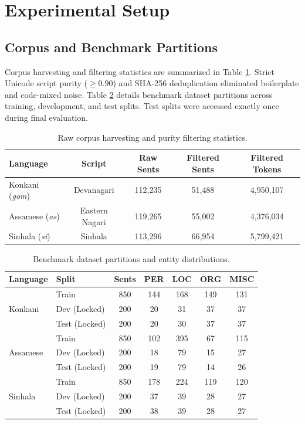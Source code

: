 \documentclass[default,iicol]{sn-jnl}
\begin{document}
\section{Experimental Setup}\label{sec5}

\subsection{Corpus and Benchmark Partitions}
Corpus harvesting and filtering statistics are summarized in Table \ref{tab1}. Strict Unicode script purity ($\ge 0.90$) and SHA-256 deduplication eliminated boilerplate and code-mixed noise. Table \ref{tab2} details benchmark dataset partitions across training, development, and test splits. Test splits were accessed exactly once during final evaluation.

\begin{table}[h]
\caption{Raw corpus harvesting and purity filtering statistics.}\label{tab1}
\centering
\begin{tabular}{lcccc}
\toprule
Language & Script & Raw Sents & Filtered Sents & Filtered Tokens \\
\midrule
Konkani (\textit{gom}) & Devanagari & 112,235 & 51,488 & 4,950,107 \\
Assamese (\textit{as}) & Eastern Nagari & 119,265 & 55,002 & 4,376,034 \\
Sinhala (\textit{si}) & Sinhala & 113,296 & 66,954 & 5,799,421 \\
\bottomrule
\end{tabular}
\end{table}

\begin{table}[h]
\caption{Benchmark dataset partitions and entity distributions.}\label{tab2}
\centering
\begin{tabular}{llccccc}
\toprule
Language & Split & Sents & PER & LOC & ORG & MISC \\
\midrule
\multirow{3}{*}{Konkani} & Train & 850 & 144 & 168 & 149 & 131 \\
 & Dev (Locked) & 200 & 20 & 31 & 37 & 37 \\
 & Test (Locked) & 200 & 20 & 30 & 37 & 37 \\
\midrule
\multirow{3}{*}{Assamese} & Train & 850 & 102 & 395 & 67 & 115 \\
 & Dev (Locked) & 200 & 18 & 79 & 15 & 27 \\
 & Test (Locked) & 200 & 19 & 79 & 14 & 26 \\
\midrule
\multirow{3}{*}{Sinhala} & Train & 850 & 178 & 224 & 119 & 120 \\
 & Dev (Locked) & 200 & 37 & 39 & 28 & 27 \\
 & Test (Locked) & 200 & 38 & 39 & 28 & 27 \\
\bottomrule
\end{tabular}
\end{table}
\end{document}
